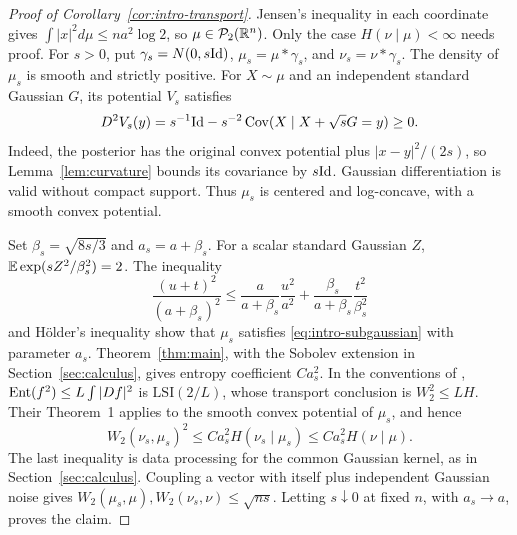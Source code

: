 \begin{proof}[Proof of Corollary~\ref{cor:intro-transport}]
Jensen's inequality in each coordinate gives
$\int|x|^2d\mu\le na^2\log2$, so $\mu\in\mathcal P_2(\mathbb R^n)$.
Only the case $H(\nu\mid\mu)<\infty$ needs proof. For $s>0$, put
$\gamma_s=N(0,s\mathrm{Id})$, $\mu_s=\mu*\gamma_s$, and
$\nu_s=\nu*\gamma_s$. The density of $\mu_s$ is smooth and strictly
positive. For $X\sim\mu$ and an independent standard Gaussian $G$,
its potential $V_s$ satisfies
\[
 D^2V_s(y)=s^{-1}\mathrm{Id}-s^{-2}\operatorname{Cov}(X\mid X+\sqrt sG=y)\ge0.
\]
Indeed, the posterior has the original convex potential plus
$|x-y|^2/(2s)$, so Lemma~\ref{lem:curvature} bounds its covariance
by $s\mathrm{Id}$. Gaussian differentiation is valid without compact support.
Thus $\mu_s$ is centered and log-concave, with a smooth convex potential.

Set $\beta_s=\sqrt{8s/3}$ and $a_s=a+\beta_s$. For a scalar standard
Gaussian $Z$, $\mathbb E\exp(sZ^2/\beta_s^2)=2$. The inequality
\[
 \frac{(u+t)^2}{(a+\beta_s)^2}
 \le\frac{a}{a+\beta_s}\frac{u^2}{a^2}
     +\frac{\beta_s}{a+\beta_s}\frac{t^2}{\beta_s^2}
\]
and H\"older's inequality show that $\mu_s$ satisfies
\eqref{eq:intro-subgaussian} with parameter $a_s$.
Theorem~\ref{thm:main}, with the Sobolev extension in
Section~\ref{sec:calculus}, gives entropy coefficient $Ca_s^2$.
In the conventions of \cite[Definitions~1--2]{OttoVillani2000},
$\operatorname{Ent}(f^2)\le L\int|Df|^2$ is $\mathrm{LSI}(2/L)$, whose
transport conclusion is $W_2^2\le LH$. Their Theorem~1 applies to
the smooth convex potential of $\mu_s$, and hence
\[
 W_2(\nu_s,\mu_s)^2\le Ca_s^2H(\nu_s\mid\mu_s)
 \le Ca_s^2H(\nu\mid\mu).
\]
The last inequality is data processing for the common Gaussian
kernel, as in Section~\ref{sec:calculus}. Coupling a vector with
itself plus independent Gaussian noise gives
$W_2(\mu_s,\mu),W_2(\nu_s,\nu)\le\sqrt{ns}$.
Letting $s\downarrow0$ at fixed $n$, with $a_s\to a$, proves the claim.
\end{proof}
